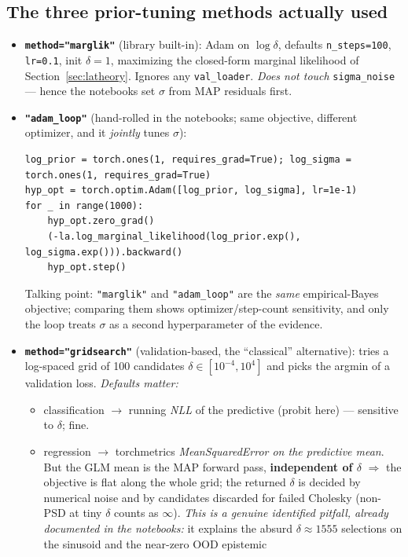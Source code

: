 \documentclass[10pt,a4paper]{article}
\newcommand{\code}[1]{\texttt{#1}}
\begin{document}
\subsection{The three prior-tuning methods actually used}
\begin{itemize}
\item \textbf{\code{method="marglik"}} (library built-in): Adam on $\log\delta$, defaults
  \code{n\_steps=100}, \code{lr=0.1}, init $\delta=1$, maximizing the closed-form marginal
  likelihood of Section~\ref{sec:latheory}. Ignores any \code{val\_loader}. \emph{Does not touch}
  \code{sigma\_noise} --- hence the notebooks set $\sigma$ from MAP residuals first.
\item \textbf{\code{"adam\_loop"}} (hand-rolled in the notebooks; same objective, different
  optimizer, and it \emph{jointly} tunes $\sigma$):
\begin{lstlisting}
log_prior = torch.ones(1, requires_grad=True); log_sigma = torch.ones(1, requires_grad=True)
hyp_opt = torch.optim.Adam([log_prior, log_sigma], lr=1e-1)
for _ in range(1000):
    hyp_opt.zero_grad()
    (-la.log_marginal_likelihood(log_prior.exp(), log_sigma.exp())).backward()
    hyp_opt.step()
\end{lstlisting}
  Talking point: \code{"marglik"} and \code{"adam\_loop"} are the \emph{same} empirical-Bayes
  objective; comparing them shows optimizer/step-count sensitivity, and only the loop treats
  $\sigma$ as a second hyperparameter of the evidence.
\item \textbf{\code{method="gridsearch"}} (validation-based, the ``classical'' alternative):
  tries a log-spaced grid of 100 candidates $\delta\in[10^{-4},10^{4}]$ and picks the argmin of a
  validation loss. \emph{Defaults matter:}
  \begin{itemize}
  \item classification $\to$ running \emph{NLL} of the predictive (probit here) --- sensitive to
    $\delta$; fine.
  \item regression $\to$ torchmetrics \emph{MeanSquaredError on the predictive mean}. But the GLM
    mean is the MAP forward pass, \textbf{independent of $\delta$} $\Rightarrow$ the objective is
    flat along the whole grid; the returned $\delta$ is decided by numerical noise and by
    candidates discarded for failed Cholesky (non-PSD at tiny $\delta$ counts as $\infty$).
    \emph{This is a genuine identified pitfall, already documented in the notebooks:} it explains
    the absurd $\delta\approx1555$ selections on the sinusoid and the near-zero OOD epistemic

\end{itemize}
\end{itemize}
\end{document}
